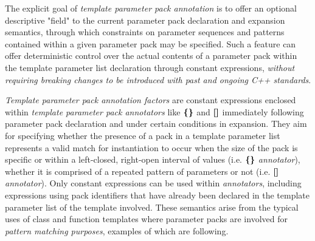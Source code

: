 
\p The explicit goal of \textit{template parameter pack annotation} is to offer an optional descriptive "field" to the current parameter pack declaration and expansion semantics, through which constraints on parameter sequences and patterns contained within a given parameter pack may be specified.
Such a feature can offer deterministic control over the actual contents of a parameter pack within the template parameter list declaration through constant expressions, \textit{without requiring breaking changes to be introduced with past and ongoing C++ standards}.

\p \textit{Template parameter pack annotation factors} are constant expressions enclosed within \textit{template parameter pack annotators} like $\mathlarger{\bm{\{\}}}$ and $\mathlarger{\bm{[]}}$ immediately following parameter pack declaration and under certain conditions in expansion.
They aim for specifying whether the presence of a pack in a template parameter list represents a valid match for instantiation to occur when the size of the pack is specific or within a left-closed, right-open interval of values (i.e. $\mathlarger{\bm{\{\}}}$ \textit{annotator}), whether it is comprised of a repeated pattern of parameters or not (i.e. $\mathlarger{\bm{[]}}$ \textit{annotator}).
Only constant expressions can be used within \textit{annotators}, including expressions using pack identifiers that have already been declared in the template parameter list of the template involved.
These semantics arise from the typical uses of class and function templates where parameter packs are involved for \textit{pattern matching purposes}, examples of which are following.
